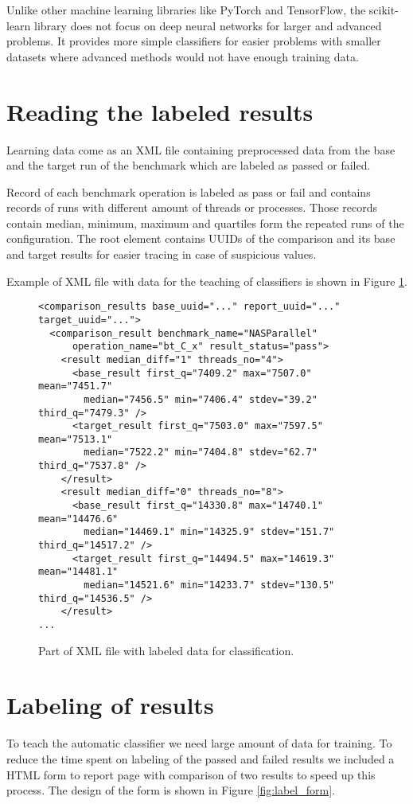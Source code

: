 Unlike other machine learning libraries like PyTorch and TensorFlow, the
scikit-learn library does not focus on deep neural networks for larger and
advanced problems. It provides more simple classifiers for easier problems
with smaller datasets where advanced methods would not have enough training
data.

\section{Reading the labeled results} \label{sec:learn_xml}
Learning data come as an XML file containing preprocessed data from
the base and the target run of the benchmark which are labeled as passed or failed.

Record of each benchmark operation is labeled as pass or fail and contains
records of runs with different amount of threads or processes. Those records
contain median, minimum, maximum and quartiles form the repeated runs of the
configuration. The root element contains UUIDs of the comparison and its base
and target results for easier tracing in case of suspicious values.

Example of XML file with data for the teaching of classifiers is shown in Figure
\ref{fig:learn_xml}.

\begin{figure}
  \small
  \begin{verbatim}
<comparison_results base_uuid="..." report_uuid="..." target_uuid="...">
  <comparison_result benchmark_name="NASParallel"
      operation_name="bt_C_x" result_status="pass">
    <result median_diff="1" threads_no="4">
      <base_result first_q="7409.2" max="7507.0" mean="7451.7"
        median="7456.5" min="7406.4" stdev="39.2" third_q="7479.3" />
      <target_result first_q="7503.0" max="7597.5" mean="7513.1"
        median="7522.2" min="7404.8" stdev="62.7" third_q="7537.8" />
    </result>
    <result median_diff="0" threads_no="8">
      <base_result first_q="14330.8" max="14740.1" mean="14476.6"
        median="14469.1" min="14325.9" stdev="151.7" third_q="14517.2" />
      <target_result first_q="14494.5" max="14619.3" mean="14481.1"
        median="14521.6" min="14233.7" stdev="130.5" third_q="14536.5" />
    </result>
...
  \end{verbatim}
  \normalsize
  \caption{Part of XML file with labeled data for classification.}
  \label{fig:learn_xml}
\end{figure}

\section{Labeling of results}
To teach the automatic classifier we need large amount of data for training. To
reduce the time spent on labeling of the passed and failed results we included a
HTML form to report page with comparison of two results to speed up this
process. The design of the form is shown in Figure \ref{fig:label_form}.

